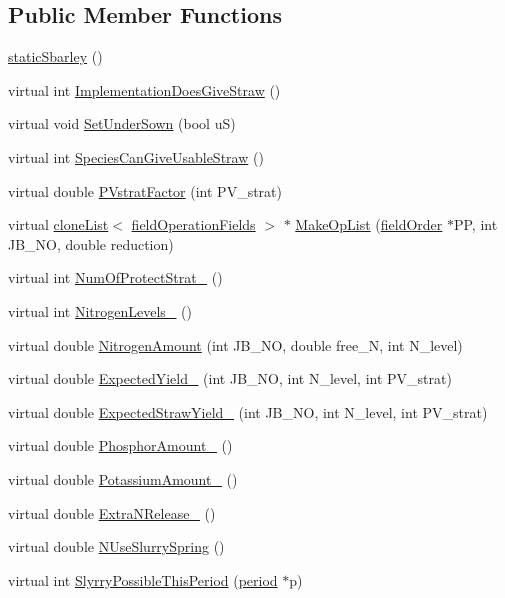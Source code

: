 \subsection*{Public Member Functions}
\begin{DoxyCompactItemize}
\item 
\hyperlink{classstatic_sbarley_a5468c834072d3a9ef96d2cc6985f1d23}{staticSbarley} ()
\item 
virtual int \hyperlink{classstatic_sbarley_a0d32acc147f8af10e83d0292396db1d2}{ImplementationDoesGiveStraw} ()
\item 
virtual void \hyperlink{classstatic_sbarley_a5bbac0ee8ba7fc10e4e85087aeb0399e}{SetUnderSown} (bool uS)
\item 
virtual int \hyperlink{classstatic_sbarley_a86fd8e85e5317a14915db5787a772bbe}{SpeciesCanGiveUsableStraw} ()
\item 
virtual double \hyperlink{classstatic_sbarley_ab3d8d74e997acbb7ef86b2edd96deaba}{PVstratFactor} (int PV\_\-strat)
\item 
virtual \hyperlink{classclone_list}{cloneList}$<$ \hyperlink{classfield_operation_fields}{fieldOperationFields} $>$ $\ast$ \hyperlink{classstatic_sbarley_a2494676d7dc13d8cc4f860b7f245ca9e}{MakeOpList} (\hyperlink{classfield_order}{fieldOrder} $\ast$PP, int JB\_\-NO, double reduction)
\item 
virtual int \hyperlink{classstatic_sbarley_a905a55ee29cf26d04bd127f4bb683a5a}{NumOfProtectStrat\_\-} ()
\item 
virtual int \hyperlink{classstatic_sbarley_acc37bda353d9d226c71e088d237c7bc7}{NitrogenLevels\_\-} ()
\item 
virtual double \hyperlink{classstatic_sbarley_adc52f0655ebee0391877abcacffc3084}{NitrogenAmount} (int JB\_\-NO, double free\_\-N, int N\_\-level)
\item 
virtual double \hyperlink{classstatic_sbarley_ae99475c54df7437405ebe7152dc78763}{ExpectedYield\_\-} (int JB\_\-NO, int N\_\-level, int PV\_\-strat)
\item 
virtual double \hyperlink{classstatic_sbarley_af3f013e0672eacf54def3f0733e9f724}{ExpectedStrawYield\_\-} (int JB\_\-NO, int N\_\-level, int PV\_\-strat)
\item 
virtual double \hyperlink{classstatic_sbarley_af16a33276428ac2eae69040b31af01a2}{PhosphorAmount\_\-} ()
\item 
virtual double \hyperlink{classstatic_sbarley_a90c55ed5dad4e783985c2f7bdbcba872}{PotassiumAmount\_\-} ()
\item 
virtual double \hyperlink{classstatic_sbarley_a400c4a118f22704806f91b1a44ea3aea}{ExtraNRelease\_\-} ()
\item 
virtual double \hyperlink{classstatic_sbarley_aefb0e706003fefdaab30b1c25d56191b}{NUseSlurrySpring} ()
\item 
virtual int \hyperlink{classstatic_sbarley_a7895b12b75f7fc2b9ddb3299ba6a21d1}{SlyrryPossibleThisPeriod} (\hyperlink{classperiod}{period} $\ast$p)
\end{DoxyCompactItemize}
